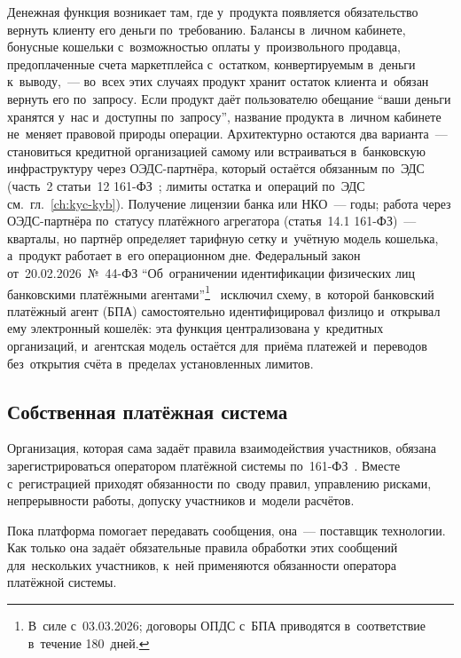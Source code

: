 Денежная функция возникает там, где у~продукта появляется обязательство вернуть
клиенту его деньги по~требованию. Балансы в~личном кабинете, бонусные кошельки
с~возможностью оплаты у~произвольного продавца, предоплаченные счета
маркетплейса с~остатком, конвертируемым в~деньги к~выводу,~--- во~всех этих
случаях продукт хранит остаток клиента и~обязан вернуть его по~запросу. Если
продукт даёт пользователю обещание \enquote{ваши деньги хранятся у~нас
и~доступны по~запросу}, название продукта в~личном кабинете не~меняет правовой
природы операции. Архитектурно остаются два варианта~--- становиться кредитной
организацией самому или встраиваться в~банковскую инфраструктуру через
ОЭДС-партнёра, который остаётся обязанным по~ЭДС (часть~2 статьи~12
  161-ФЗ~\cite{fz-161}; лимиты остатка и~операций по~ЭДС
см.~гл.~\ref{ch:kyc-kyb}). Получение лицензии банка или НКО~--- годы; работа
через ОЭДС-партнёра по~статусу платёжного агрегатора (статья~14.1 161-ФЗ)~---
кварталы, но партнёр определяет тарифную сетку и~учётную модель кошелька,
а~продукт работает в~его операционном дне. Федеральный закон
от~20.02.2026~№~44-ФЗ \enquote{Об~ограничении идентификации физических лиц
банковскими платёжными агентами}\footnote{В~силе с~03.03.2026; договоры ОПДС с~БПА
приводятся в~соответствие в~течение 180~дней.}~\cite{fz-44} исключил схему,
в~которой банковский платёжный агент (БПА) самостоятельно идентифицировал
физлицо и~открывал ему электронный кошелёк: эта функция централизована
у~кредитных организаций, и~агентская модель остаётся для~приёма платежей
и~переводов без~открытия счёта в~пределах установленных лимитов.

\subsection*{Собственная платёжная система}

Организация, которая сама задаёт правила взаимодействия участников, обязана
зарегистрироваться оператором платёжной системы по~161-ФЗ~\cite{fz-161}. Вместе
с~регистрацией приходят обязанности по~своду правил, управлению рисками,
непрерывности работы, допуску участников и~модели расчётов.

Пока платформа помогает передавать сообщения, она~--- поставщик технологии. Как
только она задаёт обязательные правила обработки этих сообщений для~нескольких
участников, к~ней применяются обязанности оператора платёжной системы.

